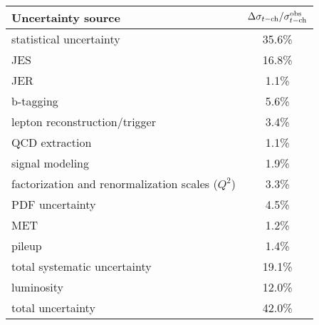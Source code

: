  \begin{table} 
 \centering
 \begin{tabular}{ |l|c| } 
  \hline 
Uncertainty source  & $\Delta \sigma_{t{\rm -ch}}/\sigma_{t{\rm -ch}}^{\rm{obs}}$\\
\hline 
 statistical uncertainty & 35.6\% \\
\hline 
JES & 16.8\%\\
JER & 1.1\%\\
b-tagging & 5.6\% \\
lepton reconstruction/trigger & 3.4\% \\
QCD extraction & 1.1\% \\
signal modeling  & 1.9\% \\
factorization and renormalization scales ($Q^2$)  & 3.3\% \\
PDF uncertainty  & 4.5\% \\
MET  & 1.2\% \\
pileup  & 1.4\% \\
 \hline
total systematic uncertainty  & 19.1\%\\
 \hline
luminosity  & 12.0\% \\
 \hline
 \hline
total uncertainty  & 42.0\%  \\
 \hline
 \end{tabular} 
 \label{tab:systematics}
 \end{table} 
